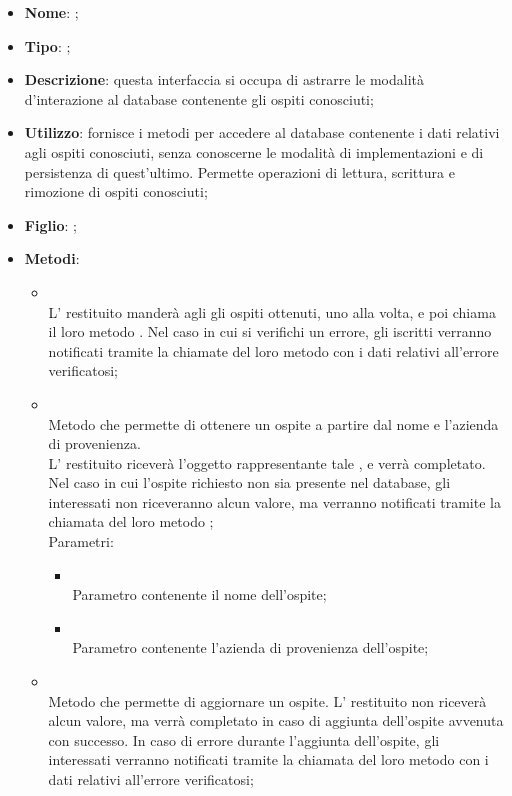 \begin{itemize}
	\item \textbf{Nome}: ;
	\item \textbf{Tipo}: ;
	\item \textbf{Descrizione}: questa interfaccia si occupa di astrarre le modalità d'interazione al database contenente gli ospiti conosciuti;
	\item \textbf{Utilizzo}: fornisce i metodi per accedere al database contenente i dati relativi agli ospiti conosciuti, senza conoscerne le modalità di implementazioni e di persistenza di quest'ultimo. Permette operazioni di lettura, scrittura e rimozione di ospiti conosciuti;
	\item \textbf{Figlio}: ;
	\item \textbf{Metodi}:
	\begin{itemize}
		\item[]  \\		L' restituito manderà agli  gli ospiti ottenuti, uno alla volta, e poi chiama il loro metodo . Nel caso in cui si verifichi un errore, gli  iscritti verranno notificati tramite la chiamate del loro metodo  con i dati relativi all'errore verificatosi;\\
		\item[]  \\		Metodo che permette di ottenere un ospite a partire dal nome e l'azienda di provenienza. \\
		L' restituito riceverà l'oggetto rappresentante tale , e verrà completato. Nel caso in cui l'ospite richiesto non sia presente nel database, gli  interessati non riceveranno alcun valore, ma verranno notificati tramite la chiamata del loro metodo ;\\
		Parametri:
		\begin{itemize}
			\item {} \\
			Parametro contenente il nome dell'ospite;
			\item {} \\
			Parametro contenente l'azienda di provenienza dell'ospite;
		\end{itemize}
		\item[]  \\		Metodo che permette di aggiornare un ospite.  L' restituito non riceverà alcun valore, ma verrà completato in caso di aggiunta dell'ospite avvenuta con successo. In caso di errore durante l'aggiunta dell'ospite, gli  interessati verranno notificati tramite la chiamata del loro metodo  con i dati relativi all'errore verificatosi;\\

\end{itemize}
\end{itemize}
